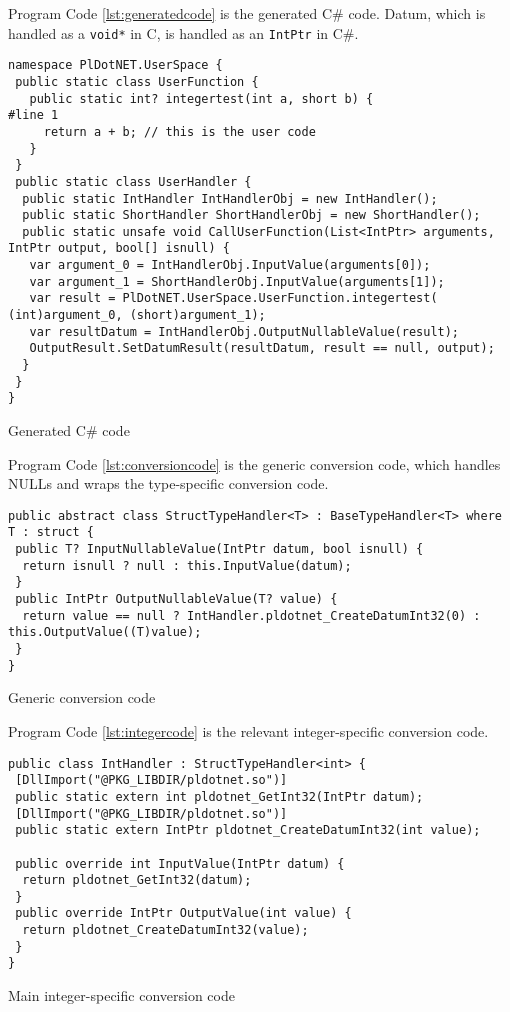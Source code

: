 \documentclass[sigconf,techreport,authorversion,nonacm]{acmart}
\begin{document}
Program Code \ref{lst:generatedcode} is the generated C\# code.  Datum, which is handled as a
\texttt{void*} in C, is handled as an \texttt{IntPtr} in C\#.

\begin{listing}[H]
\begin{verbatim}
namespace PlDotNET.UserSpace {
 public static class UserFunction {
   public static int? integertest(int a, short b) {
#line 1
     return a + b; // this is the user code
   }
 }
 public static class UserHandler {
  public static IntHandler IntHandlerObj = new IntHandler();
  public static ShortHandler ShortHandlerObj = new ShortHandler();
  public static unsafe void CallUserFunction(List<IntPtr> arguments, IntPtr output, bool[] isnull) {
   var argument_0 = IntHandlerObj.InputValue(arguments[0]);
   var argument_1 = ShortHandlerObj.InputValue(arguments[1]);
   var result = PlDotNET.UserSpace.UserFunction.integertest( (int)argument_0, (short)argument_1);
   var resultDatum = IntHandlerObj.OutputNullableValue(result);
   OutputResult.SetDatumResult(resultDatum, result == null, output);
  }
 }
}
\end{verbatim}
\caption{Generated C\# code}
\label{lst:generatedcode}
\end{listing}

Program Code \ref{lst:conversioncode} is the generic conversion code, which
handles NULLs and wraps the type-specific conversion code.

\begin{listing}[H]
\begin{verbatim}
public abstract class StructTypeHandler<T> : BaseTypeHandler<T> where T : struct {
 public T? InputNullableValue(IntPtr datum, bool isnull) {
  return isnull ? null : this.InputValue(datum);
 }
 public IntPtr OutputNullableValue(T? value) {
  return value == null ? IntHandler.pldotnet_CreateDatumInt32(0) : this.OutputValue((T)value);
 }
}
\end{verbatim}
\caption{Generic conversion code}
\label{lst:conversioncode}
\end{listing}

Program Code \ref{lst:integercode} is the relevant integer-specific conversion code.

\begin{listing}[H]
\begin{verbatim}
public class IntHandler : StructTypeHandler<int> {
 [DllImport("@PKG_LIBDIR/pldotnet.so")]
 public static extern int pldotnet_GetInt32(IntPtr datum);
 [DllImport("@PKG_LIBDIR/pldotnet.so")]
 public static extern IntPtr pldotnet_CreateDatumInt32(int value);

 public override int InputValue(IntPtr datum) {
  return pldotnet_GetInt32(datum);
 }
 public override IntPtr OutputValue(int value) {
  return pldotnet_CreateDatumInt32(value);
 }
}
\end{verbatim}
\caption{Main integer-specific conversion code}
\label{lst:integercode}
\end{listing}
\end{document}
